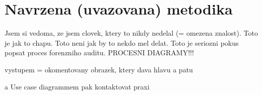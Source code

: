 \newcommand{\komentar}[1]{{\leavevmode\color[rgb]{1.0, 0.13, 0.32}#1}}
\newcommand{\sediva}[1]{{\leavevmode\color[rgb]{0.5, 0.5, 0.5}#1}}

\setcounter{chapter}{0}
\setcounter{section}{1}

 






\komentar{\chapter{Navrzena (uvazovana) metodika}}
\komentar{Jsem si vedoma, ze jsem clovek, ktery to nikdy nedelal (= omezena znalost).
Toto je jak to chapu. Toto neni jak by to nekdo mel delat. Toto je seriozni pokus popsat proces forenzniho auditu.
PROCESNI DIAGRAMY!!!

vystupem = okomentovany obrazek, ktery dava hlavu a patu

a Use case diagrammem pak kontaktovat praxi

}





%
%
% 


